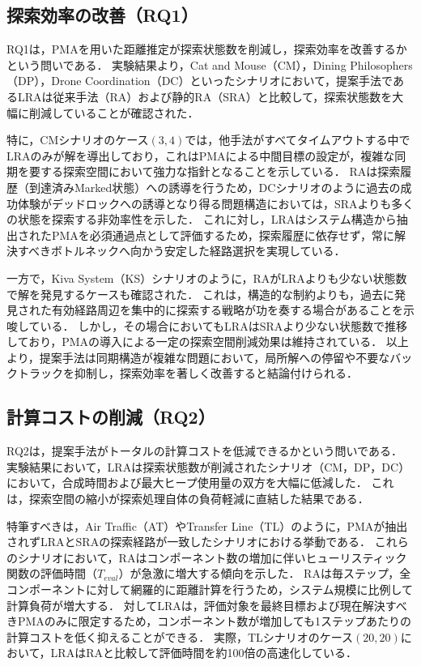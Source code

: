 \documentclass[a4paper,11pt,oneside,openany,report,dvipdfmx]{jsbook}
\begin{document}
\subsection{探索効率の改善（RQ1）}

RQ1は，PMAを用いた距離推定が探索状態数を削減し，探索効率を改善するかという問いである．
実験結果より，Cat and Mouse（CM），Dining Philosophers（DP），Drone Coordination（DC）といったシナリオにおいて，提案手法であるLRAは従来手法（RA）および静的RA（SRA）と比較して，探索状態数を大幅に削減していることが確認された．

特に，CMシナリオのケース$(3, 4)$では，他手法がすべてタイムアウトする中でLRAのみが解を導出しており，これはPMAによる中間目標の設定が，複雑な同期を要する探索空間において強力な指針となることを示している．
RAは探索履歴（到達済みMarked状態）への誘導を行うため，DCシナリオのように過去の成功体験がデッドロックへの誘導となり得る問題構造においては，SRAよりも多くの状態を探索する非効率性を示した．
これに対し，LRAはシステム構造から抽出されたPMAを必須通過点として評価するため，探索履歴に依存せず，常に解決すべきボトルネックへ向かう安定した経路選択を実現している．

一方で，Kiva System（KS）シナリオのように，RAがLRAよりも少ない状態数で解を発見するケースも確認された．
これは，構造的な制約よりも，過去に発見された有効経路周辺を集中的に探索する戦略が功を奏する場合があることを示唆している．
しかし，その場合においてもLRAはSRAより少ない状態数で推移しており，PMAの導入による一定の探索空間削減効果は維持されている．
以上より，提案手法は同期構造が複雑な問題において，局所解への停留や不要なバックトラックを抑制し，探索効率を著しく改善すると結論付けられる．

\subsection{計算コストの削減（RQ2）}

RQ2は，提案手法がトータルの計算コストを低減できるかという問いである．
実験結果において，LRAは探索状態数が削減されたシナリオ（CM，DP，DC）において，合成時間および最大ヒープ使用量の双方を大幅に低減した．
これは，探索空間の縮小が探索処理自体の負荷軽減に直結した結果である．

特筆すべきは，Air Traffic（AT）やTransfer Line（TL）のように，PMAが抽出されずLRAとSRAの探索経路が一致したシナリオにおける挙動である．
これらのシナリオにおいて，RAはコンポーネント数の増加に伴いヒューリスティック関数の評価時間（$T_\mathit{eval}$）が急激に増大する傾向を示した．
RAは毎ステップ，全コンポーネントに対して網羅的に距離計算を行うため，システム規模に比例して計算負荷が増大する．
対してLRAは，評価対象を最終目標および現在解決すべきPMAのみに限定するため，コンポーネント数が増加しても1ステップあたりの計算コストを低く抑えることができる．
実際，TLシナリオのケース$(20, 20)$において，LRAはRAと比較して評価時間を約100倍の高速化している．
\end{document}

